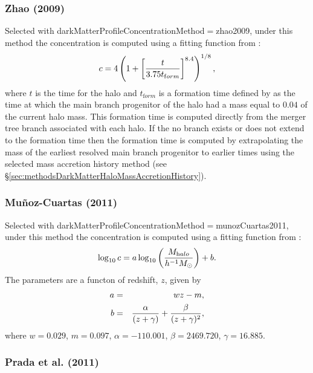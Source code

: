 \subsubsection{Zhao (2009)}\label{phys:darkMatterProfileConcentration:darkMatterProfileConcentrationZhao2009}

Selected with {\normalfont \ttfamily darkMatterProfileConcentrationMethod}$=${\normalfont \ttfamily zhao2009}, under this method the concentration is computed using a fitting function from \cite{zhao_accurate_2009}:
\begin{equation}
 c = 4 \left(1 + \left[ {t  \over 3.75 t_{\mathrm form}}\right]^{8.4}\right)^{1/8},
\end{equation}
where $t$ is the time for the halo and $t_{\mathrm form}$ is a formation time defined by \cite{zhao_accurate_2009} as the time at which the main branch progenitor of the halo had a mass equal to $0.04$ of the current halo mass. This formation time is computed directly from the merger tree branch associated with each halo. If the no branch exists or does not extend to the formation time then the formation time is computed by extrapolating the mass of the earliest resolved main branch progenitor to earlier times using the selected mass accretion history method (see \S\ref{sec:methodsDarkMatterHaloMassAccretionHistory}).

\subsubsection{Mu\~noz-Cuartas (2011)}\label{phys:darkMatterProfileConcentration:darkMatterProfileConcentrationMunozCuartas2011}

Selected with {\normalfont \ttfamily darkMatterProfileConcentrationMethod}$=${\normalfont \ttfamily munozCuartas2011}, under this method the concentration is computed using a fitting function from \cite{munoz-cuartas_redshift_2011}:
\begin{equation}
\log_{10} c = a \log_{10} \left( {M_{\mathrm halo} \over h^{-1}M_\odot} \right) + b.
\end{equation}
The parameters are a functon of redshift, $z$, given by
\begin{eqnarray}
a &=& wz-m, \\
b &=& {\alpha \over (z+\gamma)} + {\beta \over (z+\gamma)^2},
\end{eqnarray}
where $w=0.029$, $m=0.097$, $\alpha=-110.001$, $\beta=2469.720$, $\gamma=16.885$.

\subsubsection{Prada et al. (2011)}\label{phys:darkMatterProfileConcentration:darkMatterProfileConcentrationPrada2011}


